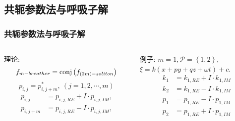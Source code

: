 \documentclass{beamer}
\newcommand{\sbrace}[1]{\left(#1\right)}
\newcommand{\bbrace}[1]{\left\{#1\right\}}
\newcommand{\conj}[1]{{\rm conj}\sbrace{#1}}
\newcommand{\PS}{\mathcal{P}}
\begin{document}
\subsection{共轭参数法与呼吸子解}
\begin{frame}
\frametitle{共轭参数法与呼吸子解}
\begin{columns}
\begin{column}{0.5\textwidth}
理论:
\[
    f_{m-breather}=\conj{f_{(2m)-soliton}} 
\]
\[
    p_{i,j}=p_{i,j+m}^*,~(j=1,2,\cdots,m)
\]
\[
\begin{split}
    p_{i,j}&=p_{i,j,RE}+I\cdot p_{i,j,IM}, \\ 
    p_{i,j+m}&=p_{i,j,RE}-I\cdot p_{i,j,IM},
\end{split}
\]
\end{column}
\begin{column}{0.5\textwidth}
例子: $m=1,\PS=\bbrace{1,2}$,\\$\xi=k(x+py+qz+\omega t)+c$.
\[
\begin{split}
    k_1&=k_{1,RE}+I\cdot k_{1,IM} \\ 
    k_2&=k_{1,RE}-I\cdot k_{1,IM} \\
    p_1&=p_{1,RE}-I\cdot p_{1,IM} \\
    p_2&=p_{1,RE}+I\cdot p_{1,IM} \\ 
\end{split} 
\]
\end{column}
\end{columns}
\end{frame}
\end{document}
